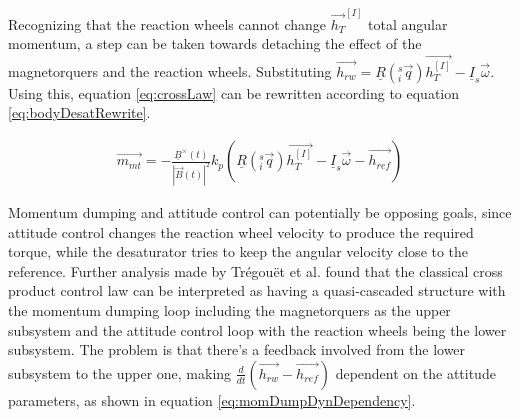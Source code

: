 Recognizing that the reaction wheels cannot change $\vec{h_{T}}^{[I]}$ total angular momentum, a step can be taken towards detaching the effect of the magnetorquers and the reaction wheels. Substituting $ \vec{h_{rw}} = \underline{R}(^s_i\vec{ q}) \vec{h_{T}^{[I]}} - \underline{I}_s \vec{\omega}$. Using this, equation \ref{eq:crossLaw} can be rewritten according to equation \ref{eq:bodyDesatRewrite}.

\begin{align}
\vec{m_{mt}} = 
-  \frac{\underline{B}^{\times}(t)}{|\vec{B}(t) |^2} k_p\left(\underline{R}(^s_i\vec{ q}) \vec{h_{T}^{[I]}} -  \underline{I}_s \vec{\omega} - \vec{h_{ref}}\right) 
\label{eq:bodyDesatRewrite}
\end{align}		


			
Momentum dumping and attitude control can potentially be opposing goals, since attitude control changes the reaction wheel velocity to produce the required torque, while the desaturator tries to keep the angular velocity close to the reference. 
Further analysis made by Trégouët et al. \cite{DesatTregouet} found that the classical cross product control law can be interpreted as having a quasi-cascaded structure with the momentum dumping loop including the magnetorquers as the upper subsystem and the attitude control loop with the reaction wheels being the lower subsystem. The problem is that there's a feedback involved from the lower subsystem to the upper one, making $\frac{d}{dt}(\vec{h_{rw}} - \vec{h_{ref}})$ dependent on the attitude parameters, as shown in equation \ref{eq:momDumpDynDependency}.  

		
